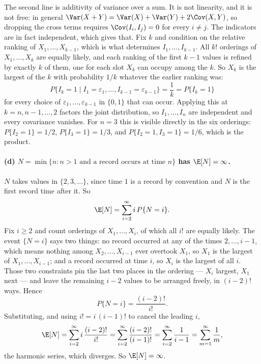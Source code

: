 \documentclass[11pt]{article}
\begin{document}
The second line is additivity of variance over a sum. It is not linearity, and it
is not free: in general $\Var(X + Y) = \Var(X) + \Var(Y) + 2\Cov(X,Y)$, so dropping
the cross terms requires $\Cov(I_i, I_j) = 0$ for every $i \neq j$. The indicators
are in fact independent, which gives that. Fix $k$ and condition on the relative
ranking of $X_1, \ldots, X_{k-1}$, which is what determines $I_1, \ldots, I_{k-1}$.
All $k!$ orderings of $X_1, \ldots, X_k$ are equally likely, and each ranking of
the first $k-1$ values is refined by exactly $k$ of them, one for each slot
$X_k$ can occupy among the $k$. So $X_k$ is the largest of the $k$ with
probability $1/k$ whatever the earlier ranking was:
$$P\{I_k = 1 \mid I_1 = \varepsilon_1, \ldots, I_{k-1} = \varepsilon_{k-1}\}
  = \frac{1}{k} = P\{I_k = 1\}$$
for every choice of $\varepsilon_1, \ldots, \varepsilon_{k-1}$ in $\{0,1\}$ that
can occur. Applying this at $k = n, n-1, \ldots, 2$ factors the joint
distribution, so $I_1, \ldots, I_n$ are independent and every covariance
vanishes. For $n = 3$ this is visible directly in the six orderings:
$P\{I_2 = 1\} = 1/2$, $P\{I_3 = 1\} = 1/3$, and $P\{I_2 = 1, I_3 = 1\} = 1/6$,
which is the product.
\paragraph{(d) $N = \min\{n : n > 1 \text{ and a record occurs at time } n\}$ has
$\E[N] = \infty$.}
$N$ takes values in $\{2, 3, \ldots\}$, since time $1$ is a record by convention and
$N$ is the first record time after it. So
\[
  \E[N] = \sum_{i=2}^{\infty} i\, P\{N = i\} .
\]
Fix $i \ge 2$ and count orderings of $X_1, \ldots, X_i$, of which all $i!$ are equally
likely. The event $\{N = i\}$ says two things: no record occurred at any of the times
$2, \ldots, i-1$, which means nothing among $X_2, \ldots, X_{i-1}$ ever overtook $X_1$,
so $X_1$ is the largest of $X_1, \ldots, X_{i-1}$; and a record occurred at time $i$,
so $X_i$ is the largest of all $i$. Those two constraints pin the last two places in the
ordering --- $X_i$ largest, $X_1$ next --- and leave the remaining $i-2$ values to be
arranged freely, in $(i-2)!$ ways. Hence
\[
  P\{N = i\} = \frac{(i-2)!}{i!} .
\]
Substituting, and using $i! = i\,(i-1)!$ to cancel the leading $i$,
\[
  \E[N]
    = \sum_{i=2}^{\infty} i\,\frac{(i-2)!}{i!}
    = \sum_{i=2}^{\infty} \frac{(i-2)!}{(i-1)!}
    = \sum_{i=2}^{\infty} \frac{1}{i-1}
    = \sum_{m=1}^{\infty} \frac{1}{m} ,
\]
the harmonic series, which diverges. So $\E[N] = \infty$.
\end{document}
